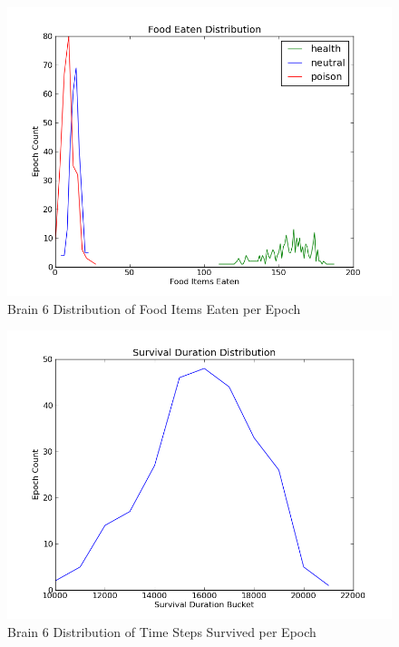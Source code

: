 \documentclass[a4paper,11pt]{article}
\begin{document}
\begin{figure}
\begin{center}
  \includegraphics[scale=1.0]{img/brain6/foodGauss-h19.99-n5.74-p8.62.png}
  \caption{Brain 6 Distribution of Food Items Eaten per Epoch}
  \label{fig:b6food}
\end{center}
\end{figure}

\begin{figure}
\begin{center}
  \includegraphics[scale=1.0]{img/brain6/survivalGauss-3452.05.png}
  \caption{Brain 6 Distribution of Time Steps Survived per Epoch}
  \label{fig:b6survive}
\end{center}
\end{figure}
\end{document}
